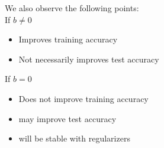 \documentclass[twoside]{article}
\begin{document}
We also observe the following points:\\
If $b \neq 0$
\begin{itemize}
    \item Improves training accuracy
    \item Not necessarily improves test accuracy
\end{itemize}
If $b = 0$
\begin{itemize}
    \item Does not improve training accuracy
    \item may improve test accuracy
    \item will be stable with regularizers
\end{itemize}
\end{document}
